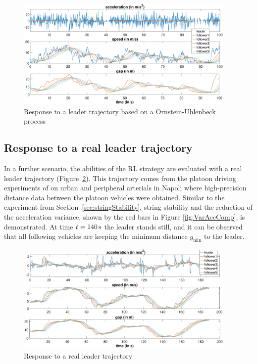 \documentclass[review]{elsarticle}
\providecommand{\sub}[1]{_{\mathrm{#1}}}  %
\providecommand{\3}{{\ss}}
\begin{document}
	
	\begin{figure}
		\centering
		\includegraphics[width=0.95\textwidth]{images/AR1Kolonne}
		\caption{Response to a leader trajectory based on a Ornstein-Uhlenbeck process}
		\label{fig:AR1Kolonne}
	\end{figure}
	
	
	\subsection{Response to a real leader trajectory}
	
	In a further scenario, the abilities of the RL strategy are evaluated
	with a real leader trajectory (Figure~\ref{fig:PunzoKolonne}). This
	trajectory comes from the platoon driving experiments of
	\cite{punzo2005nonstationary} on urban and peripheral arterials in Napoli
	where high-precision distance data between the platoon
	vehicles were obtained. Similar to the experiment from
	Section~\ref{sec:stringStability}, string stability and the reduction
	of  the acceleration variance, shown by the red bars in Figure
	\ref{fig:VarAccComp}, is demonstrated. At time $t = \unit[140]{s}$ the leader
	stands still, and it can be observed that all following vehicles are
	keeping the minimum distance $g\sub{min}$ to the leader.  
	
	
	\begin{figure}
		\centering
		\includegraphics[width=0.95\textwidth]{images/PunzoKolonne}
		\caption{Response to a real leader trajectory}
		\label{fig:PunzoKolonne}
	\end{figure}
	
\end{document}
